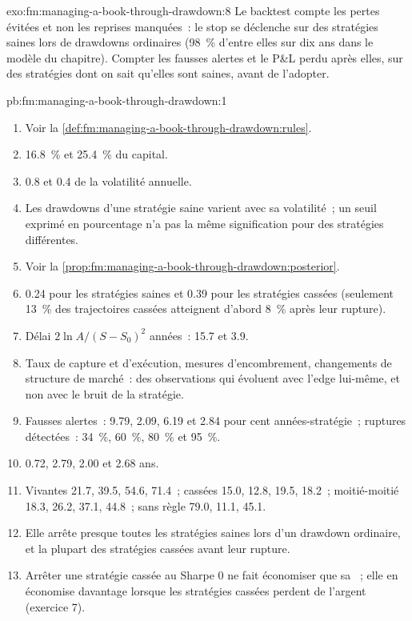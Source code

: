\begin{solution}{exo:fm:managing-a-book-through-drawdown:8}
Le backtest compte les pertes évitées et non les reprises manquées~: le stop se déclenche sur des stratégies saines lors de drawdowns ordinaires (98~\% d'entre
elles sur dix ans dans le modèle du chapitre). Compter les fausses alertes et le P\&L perdu après elles, sur des stratégies dont on sait qu'elles sont saines, avant de l'adopter.
\end{solution}

\begin{solution}{pb:fm:managing-a-book-through-drawdown:1}
\begin{enumerate}
\item Voir la \cref{def:fm:managing-a-book-through-drawdown:rules}.
\item 16.8~\% et 25.4~\% du capital.
\item 0.8 et 0.4 de la volatilité annuelle.
\item Les drawdowns d'une stratégie saine varient avec sa volatilité~; un seuil exprimé en pourcentage n'a pas la même signification pour des stratégies différentes.
\item Voir la \cref{prop:fm:managing-a-book-through-drawdown:posterior}.
\item 0.24 pour les stratégies saines et 0.39 pour les stratégies cassées (seulement 13~\% des trajectoires cassées atteignent d'abord 8~\% après leur rupture).
\item Délai $2\ln A/(S-S_0)^2$ années~: 15.7 et 3.9.
\item Taux de capture et d'exécution, mesures d'encombrement, changements de structure de marché~: des observations qui évoluent avec l'edge lui-même, et non avec le
bruit de la stratégie.
\item Fausses alertes~: 9.79, 2.09, 6.19 et 2.84 pour cent années-stratégie~; ruptures détectées~: 34~\%, 60~\%, 80~\% et 95~\%.
\item 0.72, 2.79, 2.00 et 2.68 ans.
\item Vivantes 21.7, 39.5, 54.6, 71.4~; cassées 15.0, 12.8, 19.5, 18.2~; moitié-moitié 18.3, 26.2, 37.1, 44.8~; sans règle 79.0, 11.1, 45.1.
\item Elle arrête presque toutes les stratégies saines lors d'un drawdown ordinaire, et la plupart des stratégies cassées avant leur rupture.
\item Arrêter une stratégie cassée au Sharpe 0 ne fait économiser que sa ~; elle en économise davantage lorsque les stratégies cassées perdent de l'argent (exercice 7).

\end{enumerate}
\end{solution}

